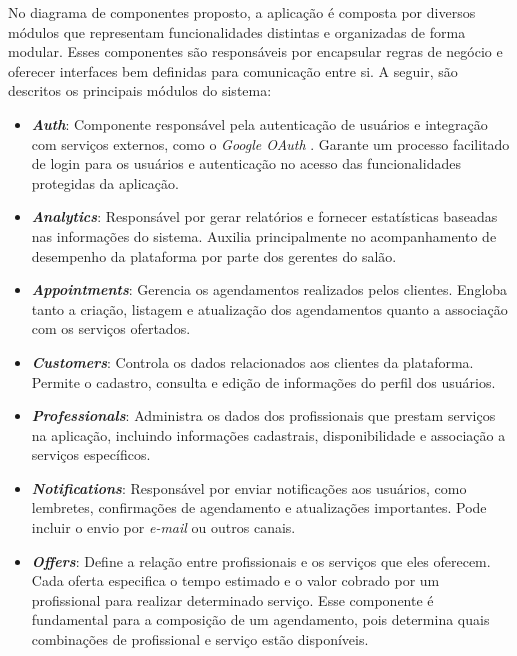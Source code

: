 No diagrama de componentes proposto, a aplicação é composta por diversos módulos que representam funcionalidades distintas e organizadas de forma modular. Esses componentes são responsáveis por encapsular regras de negócio e oferecer interfaces bem definidas para comunicação entre si. A seguir, são descritos os principais módulos do sistema:

\begin{itemize}
  \item \textbf{\emph{Auth}}: Componente responsável pela autenticação de usuários e integração com serviços externos, como o \emph{Google OAuth} \cite{GoogleOAuth}. Garante um processo facilitado de login para os usuários e autenticação no acesso das funcionalidades protegidas da aplicação.

  \item \textbf{\emph{Analytics}}: Responsável por gerar relatórios e fornecer estatísticas baseadas nas informações do sistema. Auxilia principalmente no acompanhamento de desempenho da plataforma por parte dos gerentes do salão.

  \item \textbf{\emph{Appointments}}: Gerencia os agendamentos realizados pelos clientes. Engloba tanto a criação, listagem e atualização dos agendamentos quanto a associação com os serviços ofertados.

  \item \textbf{\emph{Customers}}: Controla os dados relacionados aos clientes da plataforma. Permite o cadastro, consulta e edição de informações do perfil dos usuários.

  \item \textbf{\emph{Professionals}}: Administra os dados dos profissionais que prestam serviços na aplicação, incluindo informações cadastrais, disponibilidade e associação a serviços específicos.

  \item \textbf{\emph{Notifications}}: Responsável por enviar notificações aos usuários, como lembretes, confirmações de agendamento e atualizações importantes. Pode incluir o envio por \emph{e-mail} ou outros canais.

  \item \textbf{\emph{Offers}}: Define a relação entre profissionais e os serviços que eles oferecem. Cada oferta especifica o tempo estimado e o valor cobrado por um profissional para realizar determinado serviço. Esse componente é fundamental para a composição de um agendamento, pois determina quais combinações de profissional e serviço estão disponíveis.


\end{itemize}
